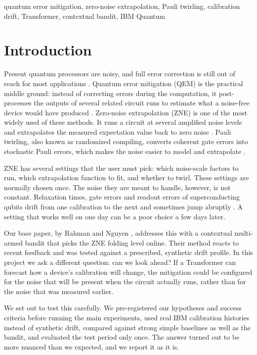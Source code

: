 \documentclass[conference]{IEEEtran}
\begin{document}
\begin{IEEEkeywords}
quantum error mitigation, zero-noise extrapolation, Pauli twirling, calibration drift, Transformer, contextual bandit, IBM Quantum
\end{IEEEkeywords}

\section{Introduction}
Present quantum processors are noisy, and full error correction is still out of reach for most applications \cite{preskill2018}. Quantum error mitigation (QEM) is the practical middle ground: instead of correcting errors during the computation, it post-processes the outputs of several related circuit runs to estimate what a noise-free device would have produced \cite{cai2023}. Zero-noise extrapolation (ZNE) is one of the most widely used of these methods. It runs a circuit at several amplified noise levels and extrapolates the measured expectation value back to zero noise \cite{temme2017,li2017,kandala2019,giurgica2020}. Pauli twirling, also known as randomized compiling, converts coherent gate errors into stochastic Pauli errors, which makes the noise easier to model and extrapolate \cite{wallman2016}.

ZNE has several settings that the user must pick: which noise-scale factors to run, which extrapolation function to fit, and whether to twirl. These settings are normally chosen once. The noise they are meant to handle, however, is not constant. Relaxation times, gate errors and readout errors of superconducting qubits drift from one calibration to the next and sometimes jump abruptly \cite{klimov2018,proctor2020}. A setting that works well on one day can be a poor choice a few days later.

Our base paper, by Rahman and Nguyen \cite{rahman2026}, addresses this with a contextual multi-armed bandit that picks the ZNE folding level online. Their method reacts to recent feedback and was tested against a prescribed, synthetic drift profile. In this project we ask a different question: can we look ahead? If a Transformer can forecast how a device's calibration will change, the mitigation could be configured for the noise that will be present when the circuit actually runs, rather than for the noise that was measured earlier.

We set out to test this carefully. We pre-registered our hypotheses and success criteria before running the main experiments, used real IBM calibration histories instead of synthetic drift, compared against strong simple baselines as well as the bandit, and evaluated the test period only once. The answer turned out to be more nuanced than we expected, and we report it as it is.
\end{document}
